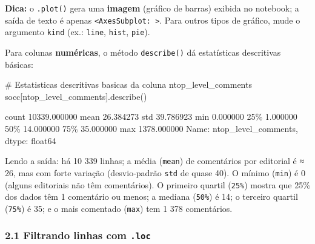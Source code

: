 \documentclass[
  brazilian,
  11pt,
]{article}
\newenvironment{Shaded}{\begin{snugshade}}{\end{snugshade}}
\newcommand{\CommentTok}[1]{\textcolor[rgb]{0.48,0.49,0.49}{#1}}
\newcommand{\NormalTok}[1]{\textcolor[rgb]{0.81,0.81,0.76}{#1}}
\newcommand{\StringTok}[1]{\textcolor[rgb]{0.96,0.31,0.31}{#1}}
\let\oldtexttt\texttt
\renewcommand{\texttt}[1]{{\color{inlink}\oldtexttt{#1}}}
\begin{document}
\begin{tipbox}

\textbf{Dica:} o \texttt{.plot()} gera uma \textbf{imagem} (gráfico de
barras) exibida no notebook; a saída de texto é apenas
\texttt{\textless{}AxesSubplot:\ \textgreater{}}. Para outros tipos de
gráfico, mude o argumento \texttt{kind} (ex.:
\texttt{\textquotesingle{}line\textquotesingle{}},
\texttt{\textquotesingle{}hist\textquotesingle{}},
\texttt{\textquotesingle{}pie\textquotesingle{}}).

\end{tipbox}

Para colunas \textbf{numéricas}, o método \texttt{describe()} dá
estatísticas descritivas básicas:

\begin{Shaded}
\begin{Highlighting}[]
\CommentTok{\# Estatisticas descritivas basicas da coluna \textquotesingle{}ntop\_level\_comments\textquotesingle{}}
\NormalTok{socc[}\StringTok{\textquotesingle{}ntop\_level\_comments\textquotesingle{}}\NormalTok{].describe()}
\end{Highlighting}
\end{Shaded}

\begin{Shaded}
\begin{Highlighting}[]
\NormalTok{count    10339.000000}
\NormalTok{mean        26.384273}
\NormalTok{std         39.786923}
\NormalTok{min          0.000000}
\NormalTok{25\%          1.000000}
\NormalTok{50\%         14.000000}
\NormalTok{75\%         35.000000}
\NormalTok{max       1378.000000}
\NormalTok{Name: ntop\_level\_comments, dtype: float64}
\end{Highlighting}
\end{Shaded}

Lendo a saída: há 10 339 linhas; a média (\texttt{mean}) de comentários
por editorial é ≈ 26, mas com forte variação (desvio‑padrão \texttt{std}
de quase 40). O mínimo (\texttt{min}) é 0 (alguns editoriais não têm
comentários). O primeiro quartil (\texttt{25\%}) mostra que 25\% dos
dados têm 1 comentário ou menos; a mediana (\texttt{50\%}) é 14; o
terceiro quartil (\texttt{75\%}) é 35; e o mais comentado (\texttt{max})
tem 1 378 comentários.

\subsubsection{\texorpdfstring{2.1 Filtrando linhas com
\texttt{.loc}}{2.1 Filtrando linhas com .loc}}\label{filtrando-linhas-com-.loc}
\end{document}
